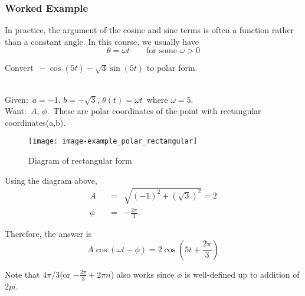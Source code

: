 \subsubsection{Worked Example}
In practice, the argument of the cosine and sine terms is often a function rather than a constant angle.
In this course, we usually have
\begin{equation*}
  \theta = \omega t \qquad \text{for some } \omega > 0
\end{equation*}

\begin{example}
  Convert $\,  -\cos (5t) - \sqrt {3} \sin (5t)$ to polar form.
\end{example}
\Solution \\
Given: $\, a=-1,\, b=-\sqrt {3},\, \theta (t)=\omega t\,$ where $\omega = 5$.\\
Want: $\, A,\, \phi .\,$ These are polar coordinates of the point with rectangular coordinates(a,b). 
\begin{figure}[ht!]
  \centering
  \texttt{[image: image-example\_polar\_rectangular]}
  \caption{Diagram of  rectangular form}
\end{figure}

Using the diagram above,
\begin{eqnarray*}
  \displaystyle A \quad & \displaystyle = & \displaystyle \sqrt{(-1)^2 + (\sqrt{3})^2} = 2\\
  \displaystyle \phi \quad & \displaystyle = & \displaystyle - \frac{2 \pi}{3}. 
\end{eqnarray*}

Therefore, the answer is
\begin{equation*}
  \displaystyle A \cos (\omega t - \phi) \displaystyle = \displaystyle 2 \cos (5t + \frac{2 \pi}{3} )
\end{equation*}

Note that $4 \pi / 3$(or $-\frac{2\pi }{3}+2\pi n$) also works since $\phi$ is
well-defined up to addition of $2 pi$. 


